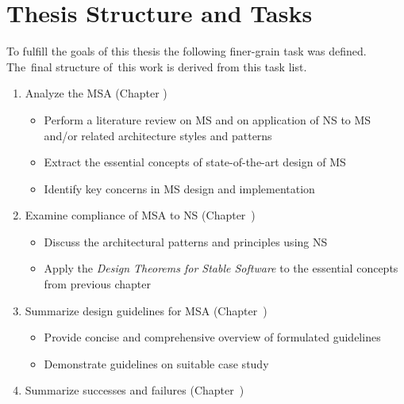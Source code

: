 \documentclass[thesis=M,english,hidelinks]{FITthesis}[2012/10/20]
\begin{document}
\section{Thesis Structure and Tasks}
To fulfill the goals of this thesis the following finer-grain task was defined. The~final structure of~this work is derived from this task list.
\begin{enumerate}

	\item Analyze the \acrlong{MSA} (Chapter \textit{})
	\begin{itemize}
		\item Perform a literature review on \acrshort{MS} and on application of \acrshort{NS} to \acrshort{MS} and/or related architecture styles and patterns
        \item Extract the essential concepts of state-of-the-art design of \acrshort{MS}
		\item Identify key concerns in \acrshort{MS} design and implementation
	\end{itemize}

	\item Examine compliance of \acrlong{MSA} to \acrlong{NS} (Chapter~\textit{})
	\begin{itemize}
		\item Discuss the architectural patterns and principles using \acrlong{NS}
		\item Apply the \textit{Design Theorems for Stable Software} \cite{ns-towards-evolvable} to the essential concepts from previous chapter
	\end{itemize}	

	\item Summarize design guidelines for \acrshort{MSA} (Chapter~\textit{})
	\begin{itemize}
		\item Provide concise and comprehensive overview of formulated guidelines
		\item Demonstrate guidelines on suitable case study
	\end{itemize}
	
	\item Summarize successes and failures (Chapter~\textit{})
\end{enumerate}
\end{document}
